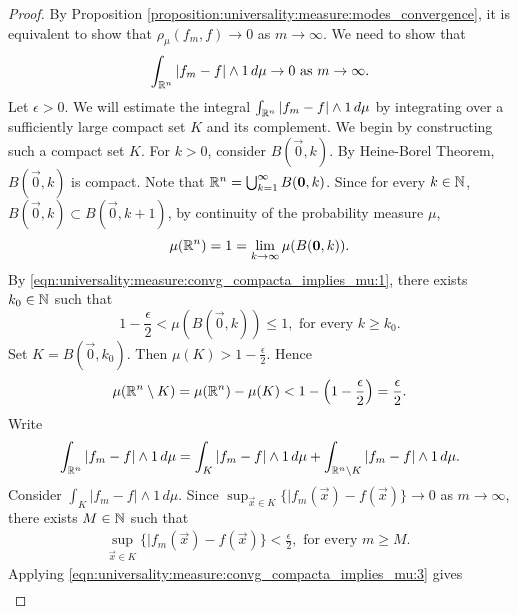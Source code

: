 \begin{proof}
By Proposition \ref{proposition:universality:measure:modes_convergence}, it is equivalent to show that $\rho_\mu(f_m, f) \to 0$ as $m \to \infty$. We need to show that \[
    \int_{{\mathbb R}^n} |f_m - f| \wedge 1 \, d\mu \to 0 \text{ as $m \to \infty$}.
\]
Let $\epsilon > 0$. We will estimate the integral $\int_{{\mathbb R}^n} |f_m - f| \wedge 1 \, d\mu$ by integrating over a sufficiently large compact set $K$ and its complement. We begin by constructing such a compact set $K$. For $k > 0$, consider $B(\vec{0}, k)$. By Heine-Borel Theorem, $B(\vec{0}, k)$ is compact. Note that ${\mathbb R}^n = \bigcup_{k=1}^\infty B(\mathbf{0}, k)$. Since for every $k \in {\mathbb N}$, $B(\vec{0}, k) \subset B(\vec{0}, k + 1)$, by continuity of the probability measure $\mu$, 
\begin{align}
    \label{eqn:universality:measure:convg_compacta_implies_mu:1}
    \mu ({\mathbb R}^n) = 1 = \lim_{k \to \infty} \mu (B(\mathbf{0}, k)).
\end{align}
By \ref{eqn:universality:measure:convg_compacta_implies_mu:1}, there exists $k_0 \in {\mathbb N}$ such that \[
1 - \frac{\epsilon}{2} < \mu (B(\vec{0}, k)) \leq 1, \text{ for every  $k \geq k_0$}.
\]
Set $K = B(\vec{0}, k_0)$. Then $\mu(K) > 1 - \frac{\epsilon}{2}$. Hence \begin{align}
    \label{eqn:universality:measure:convg_compacta_implies_mu:2}
    \mu ({\mathbb R}^n \setminus K) = \mu ({\mathbb R}^n) - \mu (K) < 1 - \left(1 - \frac{\epsilon}{2}\right) = \frac{\epsilon}{2}.
\end{align}
Write \begin{align}
    \label{eqn:universality:measure:convg_compacta_implies_mu:int_decomp}
    \int_{{\mathbb R}^n} | f_m - f | \wedge 1 \, d\mu =  \int_{K} | f_m - f | \wedge 1 \, d\mu  + \int_{{\mathbb R}^n \setminus K} | f_m - f | \wedge 1 \, d\mu. 
\end{align}
Consider $\int_{K} | f_m - f | \wedge 1 \, d\mu$. 
\newpage 
Since $\sup_{\vec{x} \in K} \{ | f_m (\vec{x}) - f(\vec{x}) \} \to 0$ as $m \to \infty$, there exists $M \in {\mathbb N}$ such that \begin{align}
    \label{eqn:universality:measure:convg_compacta_implies_mu:3}
    \sup_{\vec{x} \in K} \{ | f_m (\vec{x}) - f(\vec{x}) \} < \frac{\epsilon}{2}, \text{ for every $m \geq M$. }
\end{align}
Applying \ref{eqn:universality:measure:convg_compacta_implies_mu:3} gives
\begin{subequations}\label{eqn:universality:measure:convg_compacta_implies_mu:4}
\begin{align*}

\end{align*}
\end{subequations}
\end{proof}
